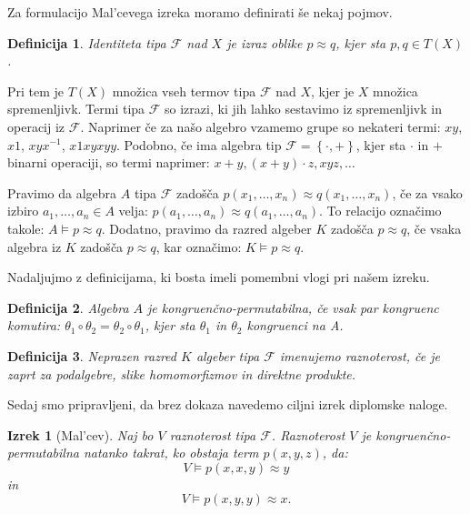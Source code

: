 \documentclass[a4paper,11pt]{article}
\newtheorem{izrek}{Izrek}
\newtheorem{definicija}{Definicija}
\begin{document}
Za formulacijo Mal'cevega izreka moramo definirati še nekaj pojmov. 
\begin{definicija}
    \emph{Identiteta} tipa $\mathcal{F}$ nad $X$ je izraz oblike $p \approx q$, kjer sta $p, q \in T\left(X\right)$.
\end{definicija}
Pri tem je $T\left(X\right)$ množica vseh termov tipa $\mathcal{F}$ nad $X$, kjer je $X$ množica spremenljivk. Termi 
tipa $\mathcal{F}$ so izrazi, ki jih lahko sestavimo iz spremenljivk in operacij iz $\mathcal{F}$. Naprimer če za našo 
algebro vzamemo grupe so nekateri termi: $xy$, $x1$, $xyx^{-1}$, $x1xyxyy$. Podobno, če ima algebra tip $\mathcal{F} =
\left\{\cdot, +\right\}$, kjer sta $\cdot$ in $+$ binarni operaciji, so termi naprimer: $x+y, (x+y) \cdot z, xyz, \ldots$

Pravimo da algebra $A$ tipa $\mathcal{F}$ zadošča $p\left(x_1, \ldots, x_n\right)\approx q\left(x_1, \ldots, x_n\right)$,
če za vsako izbiro $a_1, \ldots, a_n \in A$ velja: $p\left(a_1, \ldots, a_n\right) \approx q\left(a_1, 
\ldots, a_n\right)$. To relacijo označimo takole: $A \models p \approx q$. Dodatno, pravimo da razred algeber $K$ 
zadošča $p \approx q$, če vsaka algebra iz $K$ zadošča $p \approx q$, kar označimo: $K \models p \approx q$.

Nadaljujmo z definicijama, ki bosta imeli pomembni vlogi pri našem izreku.

\begin{definicija}
    Algebra $A$ je \emph{kongruenčno-permutabilna}, če vsak par kongruenc komutira: $\theta_1 \circ \theta_2 =
    \theta_2 \circ \theta_1$, kjer sta $\theta_1$ in $\theta_2$ kongruenci na A. 
\end{definicija}

\begin{definicija}
    Neprazen razred $K$ algeber tipa $\mathcal{F}$ imenujemo \emph{raznoterost}, če je zaprt za podalgebre, 
    slike homomorfizmov in direktne produkte.
\end{definicija}

Sedaj smo pripravljeni, da brez dokaza navedemo ciljni izrek diplomske naloge.

\begin{izrek}[Mal'cev] Naj bo $V$ raznoterost tipa $\mathcal{F}$. Raznoterost $V$ je kongruenčno-permutabilna
    natanko takrat, ko obstaja term $p\left(x, y, z\right)$, da: \\ $$V \models p\left(x,x,y\right)\approx y$$ 
    in $$V \models p\left(x,y,y\right)\approx x.$$   
\end{izrek}
\end{document}
